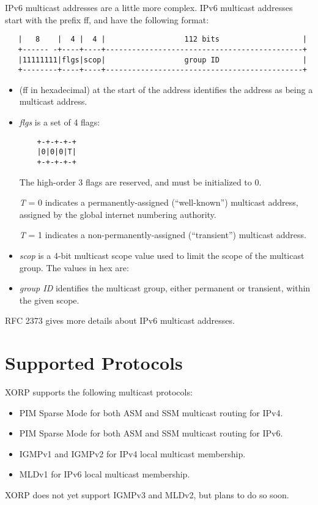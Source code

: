 IPv6 multicast addresses are a little more complex.  IPv6 multicast
addresses start with the prefix {\stt ff}, and have the following
format:
\begin{verbatim}
   |   8    |  4 |  4 |                  112 bits                   |
   +------ -+----+----+---------------------------------------------+
   |11111111|flgs|scop|                  group ID                   |
   +--------+----+----+---------------------------------------------+
\end{verbatim}
\begin{itemize}
\item {} ({\stt ff} in hexadecimal) at the start of the address
identifies the address as being a multicast address.

\item {\it flgs} is a set of 4 flags: 
\begin{verbatim}
    +-+-+-+-+
    |0|0|0|T|
    +-+-+-+-+
\end{verbatim}

The high-order 3 flags are reserved, and must be initialized to 0.

{\it T} = 0 indicates a permanently-assigned (``well-known'') multicast
address, assigned by the global internet numbering authority.

{\it T} = 1 indicates a non-permanently-assigned (``transient'')
multicast address.

\item {\it scop} is a 4-bit multicast scope value used to limit the scope of
the multicast group.  The values in hex are:

\item {\it group ID} identifies the multicast group, either permanent or
transient, within the given scope.  
\end{itemize}

RFC 2373 gives more details about IPv6 multicast addresses.

\section{Supported Protocols}

XORP supports the following multicast protocols:
\begin{itemize}
\item PIM Sparse Mode for both ASM and SSM multicast routing for IPv4.
\item PIM Sparse Mode for both ASM and SSM multicast routing for IPv6.
\item IGMPv1 and IGMPv2 for IPv4 local multicast membership. 
\item MLDv1 for IPv6 local multicast membership. 
\end{itemize}
XORP does not yet support IGMPv3 and MLDv2, but plans to do so soon.
